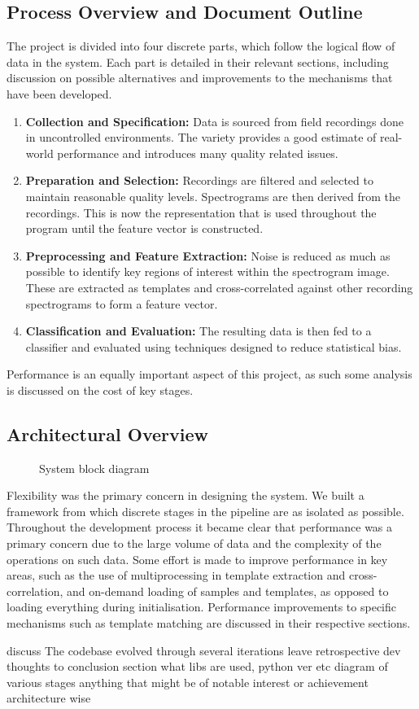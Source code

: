 \subsection{Process Overview and Document Outline}
The project is divided into four discrete parts, which follow the logical flow
of data in the system.
Each part is detailed in their relevant sections, including discussion on
possible alternatives and improvements to the mechanisms that have been
developed.
\begin{enumerate}
  \item \textbf{Collection and Specification:}
    Data is sourced from field recordings done in uncontrolled environments.
    The variety provides a good estimate of real-world performance and
    introduces many quality related issues.

  \item \textbf{Preparation and Selection:}
    Recordings are filtered and selected to maintain reasonable quality levels.
    Spectrograms are then derived from the recordings.
    This is now the representation that is used throughout the program until
    the feature vector is constructed.

  \item \textbf{Preprocessing and Feature Extraction:}
    Noise is reduced as much as possible to identify key regions of interest
    within the spectrogram image.
    These are extracted as templates and cross-correlated against other
    recording spectrograms to form a feature vector.

  \item \textbf{Classification and Evaluation:}
    The resulting data is then fed to a classifier and evaluated using techniques
    designed to reduce statistical bias.
\end{enumerate}

Performance is an equally important aspect of this project, as such some
analysis is discussed on the cost of key stages.

\subsection{Architectural Overview}

\begin{figure}
  \centering
  \caption{System block diagram}
  \label{fig:sysoverview}
\end{figure}


Flexibility was the primary concern in designing the system.
We built a framework from which discrete stages in the pipeline are as isolated
as possible.
Throughout the development process it became clear that performance was a
primary concern due to the large volume of data and the complexity of the
operations on such data.
Some effort is made to improve performance in key areas, such as the use of
multiprocessing in template extraction and cross-correlation, and on-demand
loading of samples and templates, as opposed to loading everything during
initialisation.
Performance improvements to specific mechanisms such as template matching are
discussed in their respective sections.




discuss The codebase evolved through several iterations 
leave retrospective dev thoughts to conclusion section
what libs are used, python ver etc
diagram of various stages
anything that might be of notable interest or achievement architecture wise

